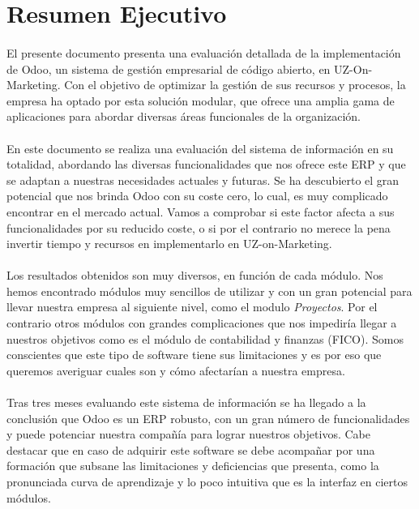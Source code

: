 \section{Resumen Ejecutivo}
\paragraph{}
El presente documento presenta una evaluación detallada de la implementación de Odoo, un sistema de gestión empresarial de código abierto, en UZ-On-Marketing. Con el objetivo de optimizar la gestión de sus recursos y procesos, la empresa ha optado por esta solución modular, que ofrece una amplia gama de aplicaciones para abordar diversas áreas funcionales de la organización.

\paragraph{}
En este documento se realiza una evaluación del sistema de información en su totalidad, abordando las diversas funcionalidades que nos ofrece este ERP y que se adaptan a nuestras necesidades actuales y futuras. Se ha descubierto el gran potencial que nos brinda Odoo con su coste cero, lo cual, es muy complicado encontrar en el mercado actual. Vamos a comprobar si este factor afecta a sus funcionalidades por su reducido coste, o si por el contrario no merece la pena invertir tiempo y recursos en implementarlo en UZ-on-Marketing.

\paragraph{}
Los resultados obtenidos son muy diversos, en función de cada módulo. Nos hemos encontrado módulos muy sencillos de utilizar y con un gran potencial para llevar nuestra empresa al siguiente nivel, como el modulo \textit{Proyectos}. Por el contrario otros módulos con grandes complicaciones que nos impediría llegar a nuestros objetivos como es el módulo de contabilidad y finanzas (FICO). Somos conscientes que este tipo de software tiene sus limitaciones y es por eso que queremos averiguar cuales son y cómo afectarían a nuestra empresa.

\paragraph{}
Tras tres meses evaluando este sistema de información se ha llegado a la conclusión que Odoo es un ERP robusto, con un gran número de funcionalidades y puede potenciar nuestra compañía para lograr nuestros objetivos. Cabe destacar que en caso de adquirir este software se debe acompañar por una formación que subsane las limitaciones y deficiencias que presenta, como la pronunciada curva de aprendizaje y lo poco intuitiva que es la interfaz en ciertos módulos. 